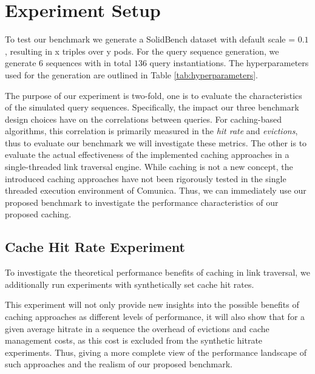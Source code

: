 \section{Experiment Setup}
To test our benchmark we generate a SolidBench dataset with default scale = $0.1$, resulting in x triples over y pods.
For the query sequence generation, we generate 6 sequences with in total $136$ query instantiations. The hyperparameters used for the generation are outlined in Table \ref{tab:hyperparameters}.

The purpose of our experiment is two-fold, one is to evaluate the characteristics of the simulated query sequences. 
Specifically, the impact our three benchmark design choices have on the correlations between queries. 
For caching-based algorithms, this correlation is primarily measured in the \textit{hit rate} and \textit{evictions}, thus to evaluate our benchmark we will investigate these metrics.
The other is to evaluate the actual effectiveness of the implemented caching approaches in a single-threaded link traversal engine.
While caching is not a new concept, the introduced caching approaches have not been rigorously tested in the single threaded execution environment of Comunica.
Thus, we can immediately use our proposed benchmark to investigate the performance characteristics of our proposed caching.

\subsection{Cache Hit Rate Experiment}
To investigate the theoretical performance benefits of caching in link traversal, we additionally run experiments with synthetically set cache hit rates.


This experiment will not only provide new insights into the possible benefits of caching approaches as different levels of performance, it will also show that for a given average hitrate in a sequence the overhead of evictions and cache management costs, as this cost is excluded from the synthetic hitrate experiments.
Thus, giving a more complete view of the performance landscape of such approaches and the realism of our proposed benchmark.
